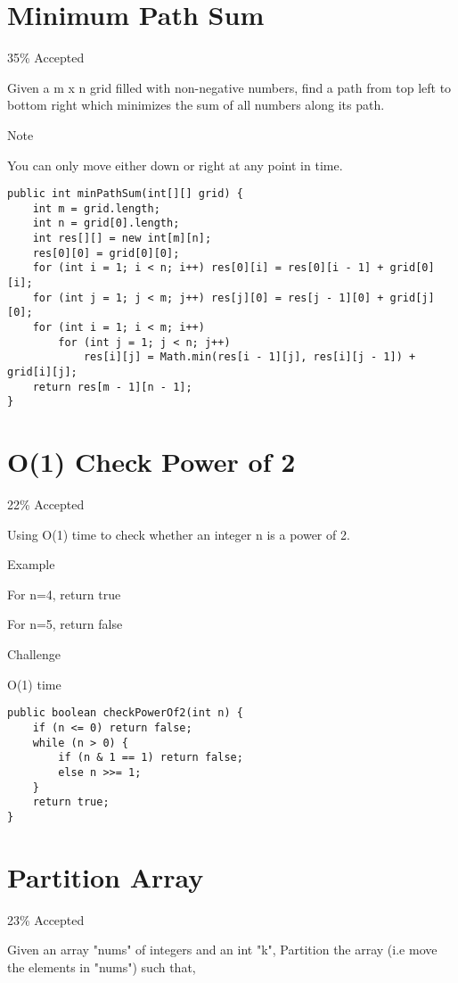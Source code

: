 \documentclass[9pt, b5paaper]{book}
\begin{document}
\section{Minimum Path Sum}
\label{sec-5-47}

35\% Accepted

Given a m x n grid filled with non-negative numbers, find a path from top left to bottom right which minimizes the sum of all numbers along its path.

Note

You can only move either down or right at any point in time.
\begin{verbatim}
public int minPathSum(int[][] grid) {
    int m = grid.length;
    int n = grid[0].length;
    int res[][] = new int[m][n];
    res[0][0] = grid[0][0];
    for (int i = 1; i < n; i++) res[0][i] = res[0][i - 1] + grid[0][i];
    for (int j = 1; j < m; j++) res[j][0] = res[j - 1][0] + grid[j][0];
    for (int i = 1; i < m; i++) 
        for (int j = 1; j < n; j++) 
            res[i][j] = Math.min(res[i - 1][j], res[i][j - 1]) + grid[i][j];
    return res[m - 1][n - 1];
}
\end{verbatim}
\section{O(1) Check Power of 2}
\label{sec-5-48}

22\% Accepted

Using O(1) time to check whether an integer n is a power of 2.

Example

For n=4, return true

For n=5, return false

Challenge

O(1) time
\begin{verbatim}
public boolean checkPowerOf2(int n) {
    if (n <= 0) return false;
    while (n > 0) {
        if (n & 1 == 1) return false;
        else n >>= 1;
    }
    return true;
}
\end{verbatim}
\section{Partition Array}
\label{sec-5-49}

23\% Accepted

Given an array "nums" of integers and an int "k", Partition the array (i.e move the elements in "nums") such that,
\end{document}
